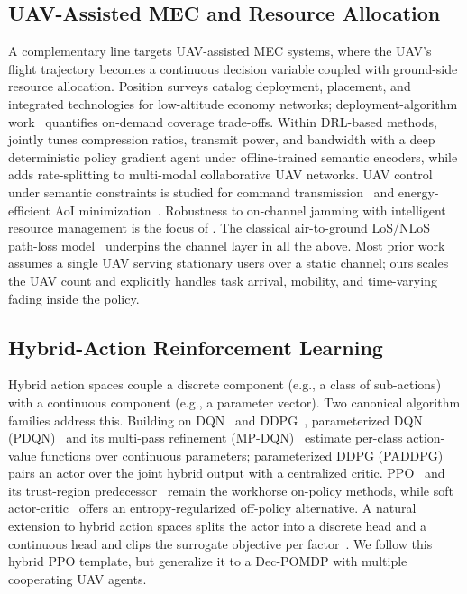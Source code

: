 \subsection{UAV-Assisted MEC and Resource Allocation}\label{subsec:rw:uavmec}
A complementary line targets UAV-assisted MEC systems, where the UAV's
flight trajectory becomes a continuous decision variable coupled with
ground-side resource allocation. Position surveys
\cite{wang2025lowalt,kaleem2024emerging,mozaffari2019tutorial} catalog
deployment, placement, and integrated technologies for low-altitude
economy networks; deployment-algorithm work~\cite{zhao2018deployment}
quantifies on-demand coverage trade-offs. Within
DRL-based methods, \cite{zhang2023drlsemantic} jointly tunes
compression ratios, transmit power, and bandwidth with a deep
deterministic policy gradient agent under offline-trained semantic
encoders, while \cite{hu2025ratesplitting} adds rate-splitting to
multi-modal collaborative UAV networks. UAV control under semantic
constraints is studied for command transmission~\cite{xu2023uavctrl} and
energy-efficient AoI minimization~\cite{long2025aoiunav}. Robustness to
on-channel jamming with intelligent resource management is the focus of
\cite{liu2024jamminguav}. The classical air-to-ground LoS/NLoS path-loss
model~\cite{alhourani2014lap} underpins the channel layer in all the
above. Most prior work assumes a single UAV serving stationary users over
a static channel; ours scales the UAV count and explicitly handles task
arrival, mobility, and time-varying fading inside the policy.

\subsection{Hybrid-Action Reinforcement Learning}\label{subsec:rw:hybridrl}
Hybrid action spaces couple a discrete component (e.g., a class of
sub-actions) with a continuous component (e.g., a parameter vector). Two
canonical algorithm families address this. Building on DQN~\cite{mnih2015dqn} and DDPG~\cite{lillicrap2016ddpg},
parameterized DQN (PDQN)~\cite{xiong2018pdqn} and its multi-pass
refinement (MP-DQN)~\cite{bester2019mpdqn} estimate per-class
action-value functions over continuous parameters; parameterized DDPG
(PADDPG)~\cite{hausknecht2016paddpg} pairs an actor over the joint
hybrid output with a centralized critic. PPO~\cite{schulman2017ppo} and its
trust-region predecessor~\cite{schulman2015trpo} remain the workhorse
on-policy methods, while soft actor-critic~\cite{haarnoja2018sac} offers
an entropy-regularized off-policy alternative. A natural extension to
hybrid action spaces splits the actor into a discrete head and a continuous
head and clips the surrogate objective per
factor~\cite{xiong2018pdqn,hu2025ratesplitting}. We follow this hybrid PPO
template, but generalize it to a Dec-POMDP with multiple cooperating UAV
agents.

